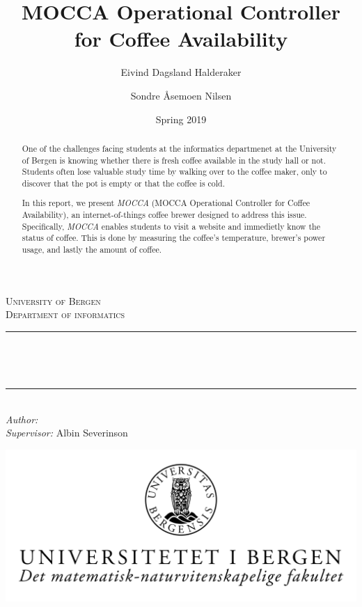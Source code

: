 \documentclass[12pt,a4paper,oneside,article]{memoir}
\title{MOCCA Operational Controller for Coffee Availability}
\author{Eivind Dagsland Halderaker \and Sondre Åsemoen Nilsen}
\date{Spring 2019}
\numberwithin{equation}{chapter}
\begin{document}
\begin{titlingpage}

\newcommand{\HRule}{\rule{\linewidth}{0.5mm}}
\centering

\textsc{\LARGE University of Bergen \\ Department of informatics}\\[1.5cm] %

\HRule\\[0.5cm]
\begin{Huge}
	\bfseries{\thetitle}\\[0.7cm]
\end{Huge}
\HRule\\[0.5cm]

{\large \emph{Author:} \theauthor}\\
{\large \emph{Supervisor:} Albin Severinson\\[2cm]}

\centerline{\includegraphics[scale=1.9]{figures/canvasWithFaculty}}
{\large \thedate}\\[3cm]
\vfill

\begin{abstract}
One of the challenges facing students at the informatics departmenet at the 
University of Bergen is knowing whether there is fresh coffee available in the 
study hall or not.  Students often lose valuable study time by walking over to 
the coffee maker, only to discover that the pot is empty or that the coffee is 
cold.

In this report, we present \textit{MOCCA} (MOCCA Operational Controller for
Coffee Availability), an internet-of-things coffee brewer designed to address
this issue. Specifically, \textit{MOCCA} enables students to visit a website and
immedietly know the status of coffee. This is done by measuring the coffee's
temperature, brewer's power usage, and lastly the amount of coffee.
\end{abstract}
\end{titlingpage}
\end{document}
